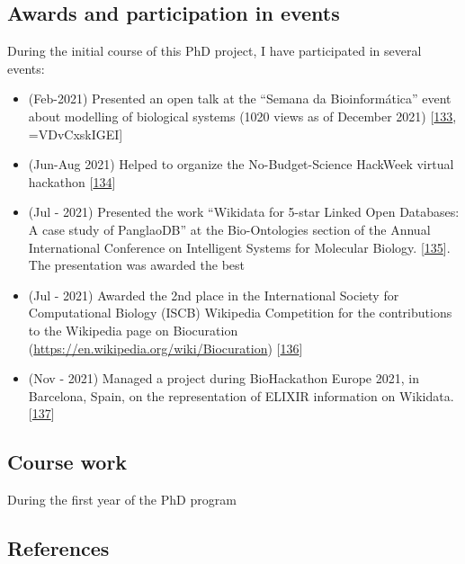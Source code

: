 \hypertarget{awards-and-participation-in-events}{%
\subsection{Awards and participation in events}\label{awards-and-participation-in-events}}

During the initial course of this PhD project, I have participated in several events:

\begin{itemize}
\tightlist
\item
  (Feb-2021) Presented an open talk at the ``Semana da Bioinformática'' event about modelling of biological systems (1020 views as of December 2021) {[}\protect\hyperlink{ref-1C9uHr1Zk}{133}, =VDvCxskIGEI{]}
\item
  (Jun-Aug 2021) Helped to organize the No-Budget-Science HackWeek virtual hackathon {[}\protect\hyperlink{ref-12LOzmXRs}{134}{]}
\item
  (Jul - 2021) Presented the work ``Wikidata for 5-star Linked Open Databases: A case study of PanglaoDB'' at the Bio-Ontologies section of the Annual International Conference on Intelligent Systems for Molecular Biology. {[}\protect\hyperlink{ref-SALI6Ywb}{135}{]}. The presentation was awarded the best
\item
  (Jul - 2021) Awarded the 2nd place in the International Society for Computational Biology (ISCB) Wikipedia Competition for the contributions to the Wikipedia page on Biocuration (\url{https://en.wikipedia.org/wiki/Biocuration}) {[}\protect\hyperlink{ref-IJG65hFm}{136}{]}
\item
  (Nov - 2021) Managed a project during BioHackathon Europe 2021, in Barcelona, Spain, on the representation of ELIXIR information on Wikidata. {[}\protect\hyperlink{ref-14Wi842eZ}{137}{]}
\end{itemize}

\hypertarget{course-work}{%
\subsection{Course work}\label{course-work}}

During the first year of the PhD program

\hypertarget{references}{%
\subsection{References}\label{references}}


